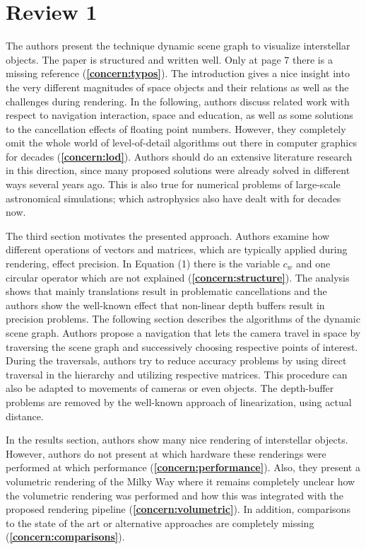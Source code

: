 \documentclass{article}
\let\oldref\ref
\renewcommand{\ref}[1]{{\color{blue}(\textbf{\oldref{#1}})}}
\begin{document}
\section*{Review 1}

 The authors present the technique dynamic scene graph to visualize interstellar objects.
The paper is structured and written well.
Only at page 7 there is a missing reference \ref{concern:typos}.
The introduction gives a nice insight into the very different magnitudes of space objects and their relations as well as the challenges during rendering.
In the following, authors discuss related work with respect to navigation interaction, space and education, as well as some solutions to the cancellation effects of floating point numbers.
However, they completely omit the whole world of level-of-detail algorithms out there in computer graphics for decades \ref{concern:lod}.
Authors should do an extensive literature research in this direction, since many proposed solutions were already solved in different ways several years ago.
This is also true for numerical problems of large-scale astronomical simulations; which astrophysics also have dealt with for decades now.

The third section motivates the presented approach.
Authors examine how different operations of vectors and matrices, which are typically applied during rendering, effect precision.
In Equation (1) there is the variable $c_w$ and one circular operator which are not explained \ref{concern:structure}. 
The analysis shows that mainly translations result in problematic cancellations and the authors show the well-known effect that non-linear depth buffers result in precision problems.
The following section describes the algorithms of the dynamic scene graph.
Authors propose a navigation that lets the camera travel in space by traversing the scene graph and successively choosing respective points of interest.
During the traversals, authors try to reduce accuracy problems by using direct traversal in the hierarchy and utilizing respective matrices.
This procedure can also be adapted to movements of cameras or even objects.
The depth-buffer problems are removed by the well-known approach of linearization, using actual distance.

In the results section, authors show many nice rendering of interstellar objects.
However, authors do not present at which hardware these renderings were performed at which performance \ref{concern:performance}.
Also, they present a volumetric rendering of the Milky Way where it remains completely unclear how the volumetric rendering was performed and how this was integrated with the proposed rendering pipeline \ref{concern:volumetric}.
In addition, comparisons to the state of the art or alternative approaches are completely missing \ref{concern:comparisons}.
\end{document}
